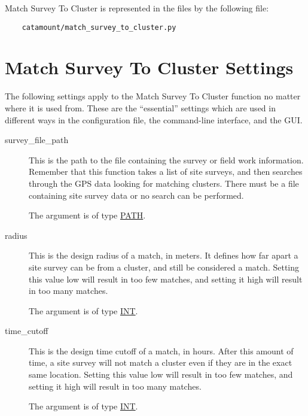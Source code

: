 Match Survey To Cluster is represented in the files by the following
file:

\begin{verbatim}
    catamount/match_survey_to_cluster.py
\end{verbatim}

\section{Match Survey To Cluster Settings}
\hypertarget{survey-to-cluster-settings}{}

The following settings apply to the Match Survey To Cluster function
no matter where it is used from. These are the ``essential'' settings
which are used in different ways in the configuration file, the
command-line interface, and the GUI.

\begin{description}

\item[survey\_file\_path]
\hypertarget{survey-to-cluster-survey-file-path}{}

This is the path to the file containing the survey or field work
information. Remember that this function takes a list of site surveys,
and then searches through the GPS data looking for matching clusters.
There must be a file containing site survey data or no search can be
performed.

The argument is of type \hyperlink{argument-type-path}{PATH}.

\item[radius]
\hypertarget{survey-to-cluster-radius}{}

This is the design radius of a match, in meters. It defines how far
apart a site survey can be from a cluster, and still be considered a
match. Setting this value low will result in too few matches, and
setting it high will result in too many matches.

The argument is of type \hyperlink{argument-type-int}{INT}.

\item[time\_cutoff]
\hypertarget{survey-to-cluster-time-cutoff}{}

This is the design time cutoff of a match, in hours. After this amount of time,
a site survey will not match a cluster even if they are in the exact
same location. Setting this value low will result in too few matches,
and setting it high will result in too many matches.

The argument is of type \hyperlink{argument-type-int}{INT}.

\end{description}


